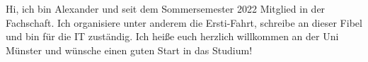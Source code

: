 \begin{multicols}{2}
{
Hi, ich bin Alexander und seit dem Sommersemester 2022 Mitglied in der Fachschaft. Ich organisiere unter anderem die Ersti-Fahrt, schreibe an dieser Fibel und bin für die IT zuständig. Ich heiße euch herzlich willkommen an der Uni Münster und wünsche einen guten Start in das Studium!
}
\fibelvorstellung{
	\begin{figure}

\end{figure}}
\end{multicols}
